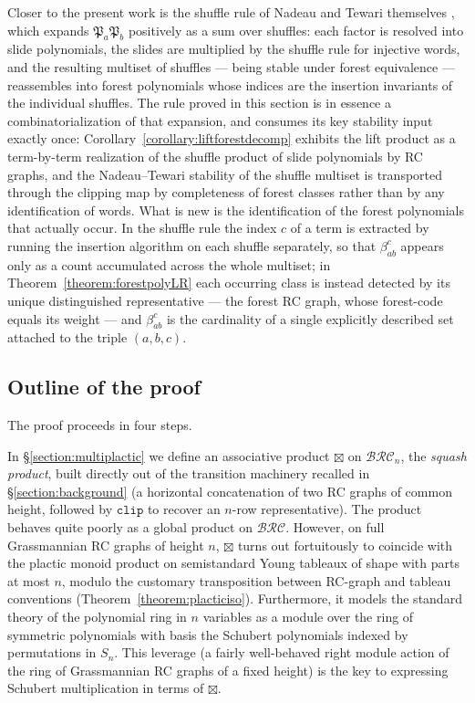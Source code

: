 \documentclass{amsart}
\theoremstyle{definition}
\theoremstyle{remark}
\numberwithin{equation}{subsection}
\newcommand{\clp}{\mathtt{clip}}
\newcommand{\BRC}{\mathcal{BRC}}
\newcommand{\forest}{\mathfrak{P}}
\begin{document}
Closer to the present work is the shuffle rule of Nadeau and Tewari themselves \cite[\S6]{nadeau2024forest}, which expands $\forest_a\forest_b$ positively as a sum over shuffles: each factor is resolved into slide polynomials, the slides are multiplied by the shuffle rule for injective words, and the resulting multiset of shuffles --- being stable under forest equivalence \cite[Theorem~6.3]{nadeau2024forest} --- reassembles into forest polynomials whose indices are the insertion invariants of the individual shuffles. The rule proved in this section is in essence a combinatorialization of that expansion, and consumes its key stability input exactly once: Corollary~\ref{corollary:liftforestdecomp} exhibits the lift product as a term-by-term realization of the shuffle product of slide polynomials by RC graphs, and the Nadeau--Tewari stability of the shuffle multiset is transported through the clipping map by completeness of forest classes rather than by any identification of words. What is new is the identification of the forest polynomials that actually occur. In the shuffle rule the index $c$ of a term is extracted by running the insertion algorithm on each shuffle separately, so that $\beta_{ab}^c$ appears only as a count accumulated across the whole multiset; in Theorem~\ref{theorem:forestpolyLR} each occurring class is instead detected by its unique distinguished representative --- the forest RC graph, whose forest-code equals its weight --- and $\beta_{ab}^c$ is the cardinality of a single explicitly described set attached to the triple $(a,b,c)$.

\subsection*{Outline of the proof}

The proof proceeds in four steps.

In \S\ref{section:multiplactic} we define an associative product $\boxtimes$ on $\BRC_n$, the \emph{squash product}, built directly out of the transition machinery recalled in \S\ref{section:background} (a horizontal concatenation of two RC graphs of common height, followed by $\clp$ to recover an $n$-row representative). The product behaves quite poorly as a global product on $\BRC$. However, on full Grassmannian RC graphs of height $n$, $\boxtimes$ turns out fortuitously to coincide with the plactic monoid product on semistandard Young tableaux of shape with parts at most $n$, modulo the customary transposition between RC-graph and tableau conventions (Theorem~\ref{theorem:placticiso}). Furthermore, it models the standard theory of the polynomial ring in $n$ variables as a module over the ring of symmetric polynomials with basis the Schubert polynomials indexed by permutations in $S_n$. This leverage (a fairly well-behaved right module action of the ring of Grassmannian RC graphs of a fixed height) is the key to expressing Schubert multiplication in terms of $\boxtimes$.
\end{document}
